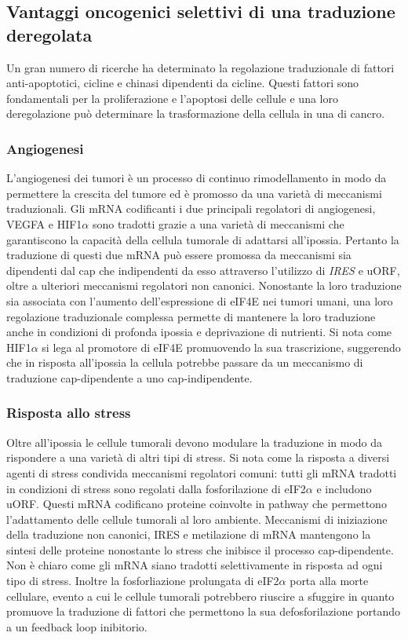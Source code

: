 	\subsection{Vantaggi oncogenici selettivi di una traduzione deregolata}
	Un gran numero di ricerche ha determinato la regolazione traduzionale di fattori anti-apoptotici, cicline e chinasi dipendenti da cicline.
	Questi fattori sono fondamentali per la proliferazione e l'apoptosi delle cellule e una loro deregolazione pu\`o determinare la trasformazione della cellula in una di cancro.

		\subsubsection{Angiogenesi}
		L'angiogenesi dei tumori \`e un processo di continuo rimodellamento in modo da permettere la crescita del tumore ed \`e promosso da una variet\`a di meccanismi traduzionali.
		Gli mRNA codificanti i due principali regolatori di angiogenesi, VEGFA e HIF1$\alpha$ sono tradotti grazie a una variet\`a di meccanismi che garantiscono la capacit\`a della cellula tumorale di adattarsi all'ipossia.
		Pertanto la traduzione di questi due mRNA pu\`o essere promossa da meccanismi sia dipendenti dal cap che indipendenti da esso attraverso l'utilizzo di \emph{IRES} e uORF, oltre a ulteriori meccanismi regolatori non canonici.
		Nonostante la loro traduzione sia associata con l'aumento dell'espressione di eIF4E nei tumori umani, una loro regolazione traduzionale complessa permette di mantenere la loro traduzione anche in condizioni di profonda ipossia e deprivazione di nutrienti.
		Si nota come HIF1$\alpha$ si lega al promotore di eIF4E promuovendo la sua trascrizione, suggerendo che in risposta all'ipossia la cellula potrebbe passare da un meccanismo di traduzione cap-dipendente a uno cap-indipendente.

		\subsubsection{Risposta allo stress}
		Oltre all'ipossia le cellule tumorali devono modulare la traduzione in modo da rispondere a una variet\`a di altri tipi di stress.
		Si nota come la risposta a diversi agenti di stress condivida meccanismi regolatori comuni: tutti gli mRNA tradotti in condizioni di stress sono regolati dalla fosforilazione di eIF2$\alpha$ e includono uORF.
		Questi mRNA codificano proteine coinvolte in pathway che permettono l'adattamento delle cellule tumorali al loro ambiente.
		Meccanismi di iniziazione della traduzione non canonici, IRES e metilazione di mRNA mantengono la sintesi delle proteine nonostante lo stress che inibisce il processo cap-dipendente.
		Non \`e chiaro come gli mRNA siano tradotti selettivamente in risposta ad ogni tipo di stress.
		Inoltre la fosforliazione prolungata di eIF2$\alpha$ porta alla morte cellulare, evento a cui le cellule tumorali potrebbero riuscire a sfuggire in quanto promuove la traduzione di fattori che permettono la sua defosforilazione portando a un feedback loop inibitorio.

